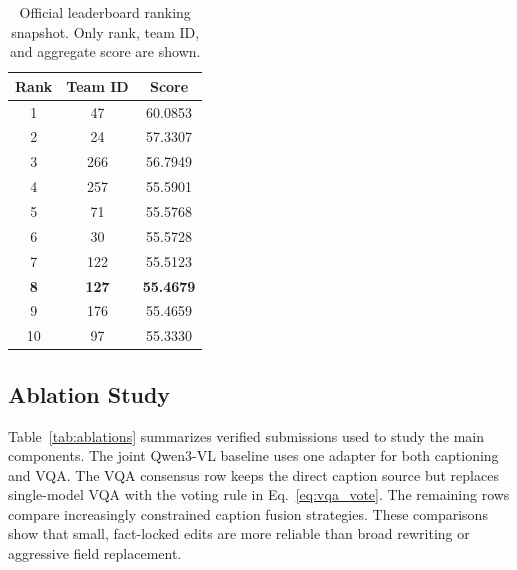 \documentclass[runningheads]{llncs}
\begin{document}
\begin{table}[h!]
\centering
\caption{Official leaderboard ranking snapshot. Only rank, team ID, and aggregate score are shown.}
\label{tab:rank_snapshot}
\small
\begin{tabular}{ccc}
\toprule
Rank & Team ID & Score \\
\midrule
1 & 47 & 60.0853 \\
2 & 24 & 57.3307 \\
3 & 266 & 56.7949 \\
4 & 257 & 55.5901 \\
5 & 71 & 55.5768 \\
6 & 30 & 55.5728 \\
7 & 122 & 55.5123 \\
\textbf{8} & \textbf{127} & \textbf{55.4679} \\
9 & 176 & 55.4659 \\
10 & 97 & 55.3330 \\
\bottomrule
\end{tabular}
\end{table}

\subsection{Ablation Study}

Table~\ref{tab:ablations} summarizes verified submissions used to study the main components. The joint Qwen3-VL baseline uses one adapter for both captioning and VQA. The VQA consensus row keeps the direct caption source but replaces single-model VQA with the voting rule in Eq.~\ref{eq:vqa_vote}. The remaining rows compare increasingly constrained caption fusion strategies. These comparisons show that small, fact-locked edits are more reliable than broad rewriting or aggressive field replacement.
\end{document}
